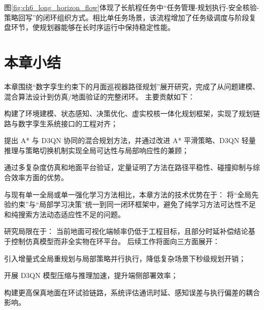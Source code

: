 图\ref{fig:ch6_long_horizon_flow}体现了长航程任务中“任务管理-规划执行-安全核验-策略回写”的闭环组织方式。相比单任务场景，该流程增加了任务级调度与阶段复盘环节，使规划器能够在长时序运行中保持稳定性能。

\section{本章小结}
\label{sec:ch6_summary}

本章围绕“数字孪生约束下的月面巡视器路径规划”展开研究，完成了从问题建模、混合算法设计到仿真/地面验证的完整闭环。
主要贡献如下：
\begin{myitemize}
\item 构建了环境建模、状态感知、决策优化、虚实校核一体化规划框架，实现了规划链路与数字孪生系统接口的工程对齐；
\item 提出 A* 与 D3QN 协同的混合规划方法，并通过改进 A* 平滑策略、D3QN 轻量推理与策略切换机制实现全局可达性与局部响应性的兼顾；
\item 通过多复杂度仿真和地面平台验证，定量证明了方法在路径平稳性、碰撞抑制与综合效率方面的优势。
\end{myitemize}

与现有单一全局或单一强化学习方法相比，本章方法的技术优势在于：
将“全局先验约束”与“局部学习决策”统一到同一闭环框架中，避免了纯学习方法可达性不足和纯搜索方法动态适应性不足的问题。

研究局限在于：
当前地面可视化端帧率仍低于工程目标，且部分时延补偿结论基于控制仿真模型而非全实物在环平台。
后续工作将面向三方面展开：
\begin{myitemize}
\item 引入增量式全局重规划与局部策略并行执行，降低复杂场景下秒级规划开销；
\item 开展 D3QN 模型压缩与推理加速，提升端侧部署效率；
\item 构建更高保真地面在环试验链路，系统评估通讯时延、感知误差与执行偏差的耦合影响。
\end{myitemize}
